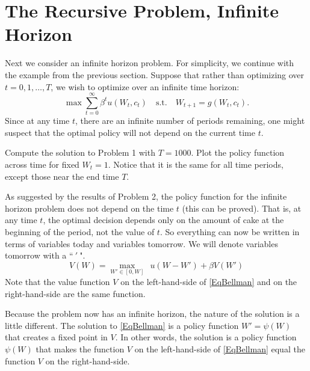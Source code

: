 \section*{The Recursive Problem, Infinite Horizon}\label{SecRecProbInFHor}
Next we consider an infinite horizon problem.  For simplicity, we continue with the example from the previous section.  Suppose that rather than optimizing over $t = 0,1,\ldots,T$, we wish to optimize over an infinite time horizon:
\begin{equation}\label{inf_prob}
\max \sum_{t=0}^\infty \beta^t u(W_t,c_t) \quad \text{s.t.} \quad W_{t+1} = g(W_t,c_t).
\end{equation}
Since at any time $t$, there are an infinite number of periods remaining, one might suspect that the optimal policy will not depend on the current time $t$.

\begin{problem}
Compute the solution to Problem 1 with $T = 1000$.  Plot the policy function across time for fixed $W_t = 1$.  Notice that it is the same for all time periods, except those near the end time $T$.
\end{problem}

As suggested by the results of Problem 2,  the policy function for the infinite horizon problem does not depend on the time $t$ (this can be proved).  That is, at any time $t$, the optimal decision depends only on the amount of cake at the beginning of the period, not the value of $t$.  So everything can now be written in terms of variables today and variables tomorrow. We will denote variables tomorrow with a ``$\:'\:$".
\begin{equation}\label{EqBellman}
   V\left(W\right) = \max_{W'\in[0,W]}\:\: u\left(W - W'\right) + \beta V\left(W'\right)
\end{equation}
Note that the value function $V$ on the left-hand-side of \eqref{EqBellman} and on the right-hand-side are the same function.

Because the problem now has an infinite horizon, the nature of the solution is a little different. The solution to \eqref{EqBellman} is a policy function $W'=\psi(W)$ that creates a fixed point in $V$. In other words, the solution is a policy function $\psi(W)$ that makes the function $V$ on the left-hand-side of \eqref{EqBellman} equal the function $V$ on the right-hand-side.


